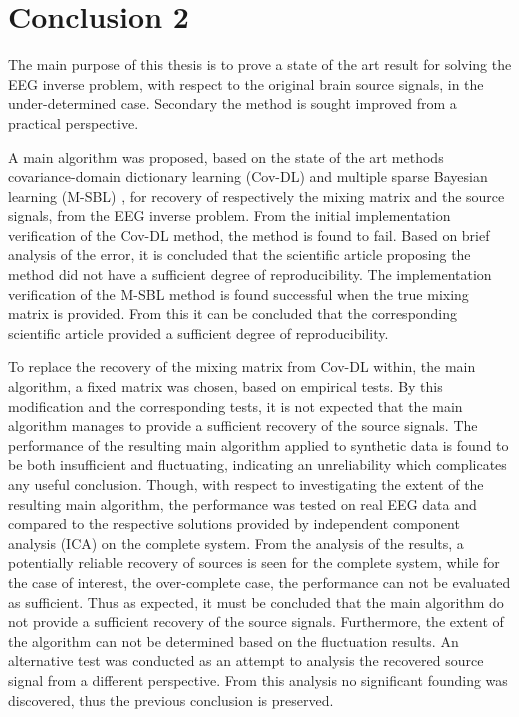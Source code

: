\chapter{Conclusion 2}
The main purpose of this thesis is to prove a state of the art result for solving the EEG inverse problem, with respect to the original brain source signals, in the under-determined case.
Secondary the method is sought improved from a practical perspective.

A main algorithm was proposed, based on the state of the art methods covariance-domain dictionary learning (Cov-DL) \cite{Balkan2015} and multiple sparse Bayesian learning (M-SBL) \cite{Balkan2014}, for recovery of respectively the mixing matrix and the source signals, from the EEG inverse problem. 
From the initial implementation verification of the Cov-DL method, the method is found to fail. Based on brief analysis of the error, it is concluded that the scientific article proposing the method did not have a sufficient degree of reproducibility. 
The implementation verification of the M-SBL method is found successful when the true mixing matrix is provided. From this it can be concluded that the corresponding scientific article provided a sufficient degree of reproducibility. 

To replace the recovery of the mixing matrix from Cov-DL within, the main algorithm, a fixed matrix was chosen, based on empirical tests.
By this modification and the corresponding tests, it is not expected that the main algorithm manages to provide a sufficient recovery of the source signals. The performance of the resulting main algorithm applied to synthetic data is found to be both insufficient and fluctuating, indicating an unreliability which complicates any useful conclusion. 
Though, with respect to investigating the extent of the resulting main algorithm, the performance was tested on real EEG data and compared to the respective solutions provided by independent component analysis (ICA) on the complete system. 
From the analysis of the results, a potentially reliable recovery of sources is seen for the complete system, while for the case of interest, the over-complete case, the performance can not be evaluated as sufficient. Thus as expected, it must be concluded that the main algorithm do not provide a sufficient recovery of the source signals. Furthermore, the extent of the algorithm can not be determined based on the fluctuation results. 
An alternative test was conducted as an attempt to analysis the recovered source signal from a different perspective. From this analysis no significant founding was discovered, thus the previous conclusion is preserved. 

